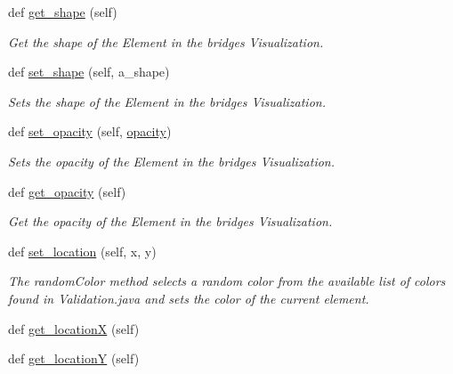 \begin{DoxyCompactItemize}
def \hyperlink{classbridges_1_1element__visualizer_1_1_element_visualizer_a7f4d717fbc741c23069f87cf01a93019}{get\+\_\+shape} (self)
\begin{DoxyCompactList}\small\item\em Get the shape of the Element in the bridges Visualization. \end{DoxyCompactList}\item 
def \hyperlink{classbridges_1_1element__visualizer_1_1_element_visualizer_a3c299b071e967781c75009325813cdb1}{set\+\_\+shape} (self, a\+\_\+shape)
\begin{DoxyCompactList}\small\item\em Sets the shape of the Element in the bridges Visualization. \end{DoxyCompactList}\item 
def \hyperlink{classbridges_1_1element__visualizer_1_1_element_visualizer_a2d29661b16e53fa3c9f9fa7aba20c8a0}{set\+\_\+opacity} (self, \hyperlink{classbridges_1_1element__visualizer_1_1_element_visualizer_add8eebf4bece910f0d6899fedd71b139}{opacity})
\begin{DoxyCompactList}\small\item\em Sets the opacity of the Element in the bridges Visualization. \end{DoxyCompactList}\item 
def \hyperlink{classbridges_1_1element__visualizer_1_1_element_visualizer_ad2c89b3d7666c7c121425a86dcb2e713}{get\+\_\+opacity} (self)
\begin{DoxyCompactList}\small\item\em Get the opacity of the Element in the bridges Visualization. \end{DoxyCompactList}\item 
def \hyperlink{classbridges_1_1element__visualizer_1_1_element_visualizer_a7aef4402f2de7e88a3260bbec3a708a7}{set\+\_\+location} (self, x, y)
\begin{DoxyCompactList}\small\item\em The random\+Color method selects a random color from the available list of colors found in Validation.\+java and sets the color of the current element. \end{DoxyCompactList}\item 
def \hyperlink{classbridges_1_1element__visualizer_1_1_element_visualizer_a421fed895be9c1b52f373a2e41fb47e2}{get\+\_\+location\+X} (self)
\item 
def \hyperlink{classbridges_1_1element__visualizer_1_1_element_visualizer_ae3667a299f795f3a618a9c8a461fd548}{get\+\_\+location\+Y} (self)
\end{DoxyCompactItemize}
